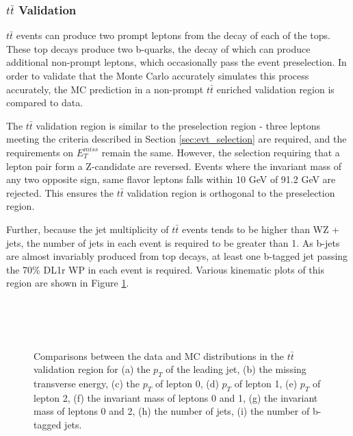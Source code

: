 \subsubsection{$t\bar{t}$ Validation}

$t\bar{t}$ events can produce two prompt leptons from the decay of each of the tops. These top decays produce two b-quarks, the decay of which can produce additional non-prompt leptons, which occasionally pass the event preselection. In order to validate that the Monte Carlo accurately simulates this process accurately, the MC prediction in a non-prompt $t\bar{t}$ enriched validation region is compared to data.

The $t\bar{t}$ validation region is similar to the preselection region - three leptons meeting the criteria described in Section \ref{sec:evt_selection} are required, and the requirements on $E_T^{miss}$ remain the same. However, the selection requiring that a lepton pair form a Z-candidate are reversed. Events where the invariant mass of any two opposite sign, same flavor leptons falls within 10 GeV of 91.2 GeV are rejected. This ensures the $t\bar{t}$ validation region is orthogonal to the preselection region. 

Further, because the jet multiplicity of $t\bar{t}$ events tends to be higher than WZ + jets, the number of jets in each event is required to be greater than 1. As b-jets are almost invariably produced from top decays, at least one b-tagged jet passing the 70\% DL1r WP in each event is required. Various kinematic plots of this region are shown in Figure \ref{fig:ttbar_noScale}.

\begin{figure}[H] 
    \centering
    \\
    \\
    \\
    \caption{Comparisons between the data and MC distributions in the $t\bar{t}$ validation region for (a) the $p_T$ of the leading jet, (b) the missing transverse energy, (c) the $p_T$ of lepton 0, (d) $p_T$ of lepton 1, (e) $p_T$ of lepton 2, (f) the invariant mass of leptons 0 and 1, (g) the invariant mass of leptons 0 and 2, (h) the number of jets, (i) the number of b-tagged jets.}
    \label{fig:ttbar_noScale}
\end{figure}


